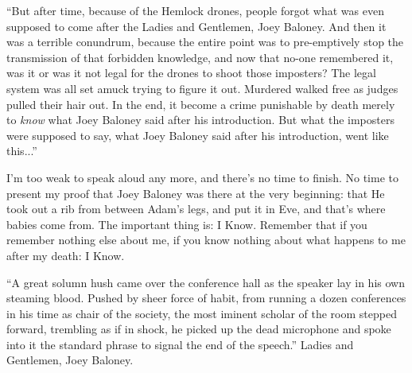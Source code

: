 \documentclass{memoir}
\begin{document}
``But after time, because of the Hemlock drones, people forgot what was even supposed to come after the Ladies and Gentlemen, Joey Baloney.  And then it was a terrible conundrum, because the entire point was to
pre-emptively stop the transmission of that forbidden knowledge, and now that no-one remembered it, was it or was it not legal for the drones to shoot those imposters?  The legal system was all set amuck trying to figure it out.  Murdered walked free as judges pulled their hair out.
In the end, it become a crime punishable by death merely to \emph{know}
what Joey Baloney said after his introduction.
But what the imposters were supposed to say, what Joey Baloney said after his introduction, went like this...''

I'm too weak to speak aloud any more, and there's no time to finish.
No time to present my proof that Joey Baloney was there at the very beginning:
that He took out a rib from between Adam's legs, and put it in Eve, and that's where babies come from.
The important thing is:  I Know.  Remember that if you remember nothing else about me, if you know nothing about what happens to me after my death:  I Know.

``A great solumn hush came over the conference hall as the speaker
lay in his own steaming blood.  Pushed by sheer force of habit, from running a dozen conferences in his time as chair of the society, the most iminent scholar of the room stepped forward, trembling as if in shock, he picked up the dead microphone and spoke into it the standard phrase to signal the end of the speech.''  Ladies and Gentlemen, Joey Baloney.
\end{document}
